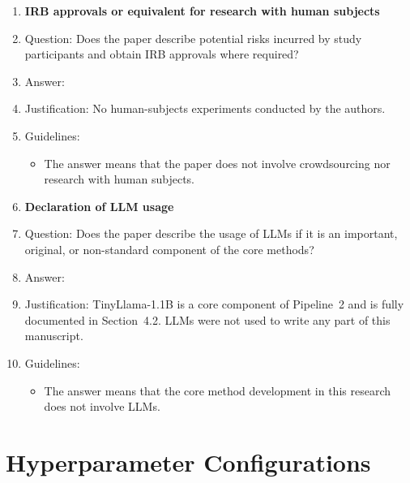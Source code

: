\documentclass{article}
\begin{document}
\begin{enumerate}
\item {\bf IRB approvals or equivalent for research with human subjects}
    \item[] Question: Does the paper describe potential risks incurred by study participants and obtain IRB approvals where required?
    \item[] Answer: \answerNA{}
    \item[] Justification: No human-subjects experiments conducted by the authors.
    \item[] Guidelines:
    \begin{itemize}
        \item The answer \answerNA{} means that the paper does not involve crowdsourcing nor research with human subjects.
    \end{itemize}

\item {\bf Declaration of LLM usage}
    \item[] Question: Does the paper describe the usage of LLMs if it is an important, original, or non-standard component of the core methods?
    \item[] Answer: \answerYes{}
    \item[] Justification: TinyLlama-1.1B is a core component of Pipeline~2 and is fully documented in Section~4.2. LLMs were not used to write any part of this manuscript.
    \item[] Guidelines:
    \begin{itemize}
        \item The answer \answerNA{} means that the core method development in this research does not involve LLMs.
    \end{itemize}

\end{enumerate}

\appendix

\section{Hyperparameter Configurations}
\label{app:hyperparams}
\end{document}
